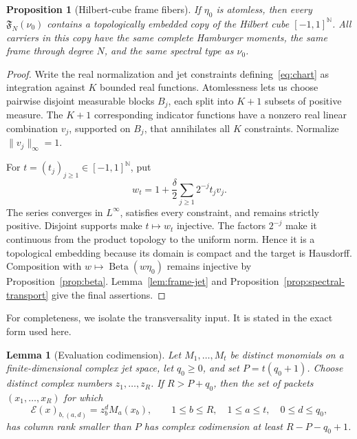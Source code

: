 \documentclass[11pt]{article}
\newtheorem{proposition}[theorem]{Proposition}
\newtheorem{lemma}[theorem]{Lemma}
\newcommand{\N}{\mathbb N}
\newcommand{\Beta}{\operatorname{Beta}}
\begin{document}
\begin{proposition}[Hilbert-cube frame fibers]\label{prop:hilbert-cube}
If $\eta_0$ is atomless, then every $\mathfrak F_N(\nu_0)$ contains a topologically embedded copy
of the Hilbert cube $[-1,1]^{\N}$.  All carriers in this copy have the same complete Hamburger
moments, the same frame through degree $N$, and the same spectral type as $\nu_0$.
\end{proposition}

\begin{proof}
Write the real normalization and jet constraints defining~\eqref{eq:chart} as integration against
$K$ bounded real functions.  Atomlessness lets us choose pairwise disjoint measurable blocks
$B_j$, each split into $K+1$ subsets of positive measure.  The $K+1$ corresponding indicator
functions have a nonzero real linear combination $v_j$, supported on $B_j$, that annihilates all
$K$ constraints.  Normalize $\|v_j\|_\infty=1$.

For $t=(t_j)_{j\geq1}\in[-1,1]^{\N}$, put
\begin{equation}\label{eq:hilbert-cube}
  w_t=1+\frac{\delta}{2}\sum_{j\geq1}2^{-j}t_jv_j.
\end{equation}
The series converges in $L^\infty$, satisfies every constraint, and remains strictly positive.
Disjoint supports make $t\mapsto w_t$ injective.  The factors $2^{-j}$ make it continuous from the
product topology to the uniform norm.  Hence it is a topological embedding because its domain is
compact and the target is Hausdorff.  Composition with $w\mapsto\Beta(w\eta_0)$ remains injective
by Proposition~\ref{prop:beta}.  Lemma~\ref{lem:frame-jet} and
Proposition~\ref{prop:spectral-transport} give the final assertions.
\end{proof}

For completeness, we isolate the transversality input.  It is stated in the exact form used here.

\begin{lemma}[Evaluation codimension]\label{lem:evaluation-codim}
Let $M_1,\ldots,M_t$ be distinct monomials on a finite-dimensional complex jet space, let
$q_0\geq0$, and set $P=t(q_0+1)$.  Choose distinct complex numbers
$z_1,\ldots,z_R$.  If $R>P+q_0$, then the set of packets
$(x_1,\ldots,x_R)$ for which
\begin{equation}\label{eq:evaluation-matrix}
  \mathcal E(x)_{b,(a,d)}=z_b^dM_a(x_b),\qquad
  1\leq b\leq R,\quad 1\leq a\leq t,\quad 0\leq d\leq q_0,
\end{equation}
has column rank smaller than $P$ has complex codimension at least
$R-P-q_0+1$.
\end{lemma}
\end{document}

